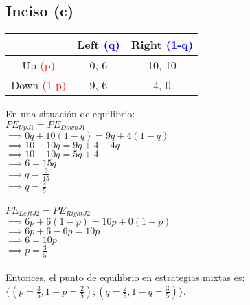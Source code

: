 \documentclass{article}
\begin{document}
        \subsection*{Inciso (c)}
            \begin{table}[H]
                \begin{tabular}{|c|c|c|}
                    \hline
                        & Left \textcolor{blue}{(q)} & Right \textcolor{blue}{(1-q)} \\ \hline
                    Up \textcolor{red}{(p)}  & 0, 6 & 10, 10 \\ 
                    Down \textcolor{red}{(1-p)} & 9, 6 & 4, 0 \\ \hline
                \end{tabular}
            \end{table}
            En una situación de equilibrio: \\
            \(PE_{UpJ1} = PE_{DownJ1}\) \\
            \(\implies 0q + 10(1-q) = 9q + 4(1-q)\) \\
            \(\implies 10-10q = 9q+4-4q\) \\
            \(\implies 10-10q = 5q+4\) \\
            \(\implies 6 = 15q\) \\
            \(\implies q = \frac{6}{15}\) \\
            \(\implies q = \frac{2}{5}\) \\
            \\
            \(PE_{LeftJ2} = PE_{RightJ2}\) \\
            \(\implies 6p + 6(1-p) = 10p + 0(1-p)\) \\
            \(\implies 6p+6-6p = 10p\) \\
            \(\implies 6 = 10p\) \\
            \(\implies p = \frac{3}{5}\) \\
            \\
            Entonces, el punto de equilibrio en estrategias mixtas es: \(\{(p = \frac{3}{5}, 1-p = \frac{2}{5});(q = \frac{2}{5}, 1-q = \frac{3}{5})\}\).
\end{document}
